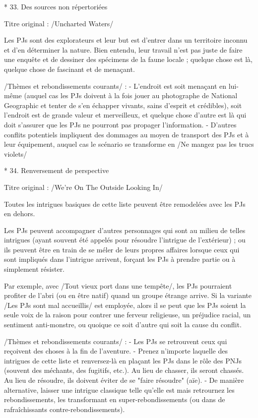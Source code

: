 \begin{enumerate}
* 33. Des sources non répertoriées

Titre original : /Uncharted Waters/

Les PJs sont des explorateurs et leur but est d'entrer dans un territoire inconnu et d'en déterminer la nature. Bien entendu, leur travail n'est pas juste de faire une enquête et de dessiner des spécimens de la faune locale ; quelque chose est là, quelque chose de fascinant et de menaçant.

/Thèmes et rebondissements courants/ :
- L'endroit est soit menaçant en lui-même (auquel cas les PJs doivent à la fois jouer au photographe de National Geographic et tenter de s'en échapper vivants, sains d'esprit et crédibles), soit l'endroit est de grande valeur et merveilleux, et quelque chose d'autre est là qui doit s'assurer que les PJs ne pourront pas propager l'information.
- D'autres conflits potentiels impliquent des dommages au moyen de transport des PJs et à leur équipement, auquel cas le scénario se transforme en /Ne mangez pas les trucs violets/

* 34. Renversement de perspective

Titre original : /We're On The Outside Looking In/

Toutes les intrigues basiques de cette liste peuvent être remodelées avec les PJs en dehors.

Les PJs peuvent accompagner d'autres personnages qui sont au milieu de telles intrigues (ayant souvent été appelés pour résoudre l'intrigue de l'extérieur) ; ou ils peuvent être en train de se méler de leurs propres affaires lorsque ceux qui sont impliqués dans l'intrigue arrivent, forçant les PJs à prendre partie ou à simplement résister.

Par exemple, avec /Tout vieux port dans une tempête/, les PJs pourraient profiter de l'abri (ou en être natif) quand un groupe étrange arrive. Si la variante /Les PJs sont mal accueillis/ est employée, alors il se peut que les PJs soient la seule voix de la raison pour contrer une ferveur religieuse, un préjudice racial, un sentiment anti-monstre, ou quoique ce soit d'autre qui soit la cause du conflit.

/Thèmes et rebondissements courants/ :
- Les PJs se retrouvent ceux qui reçoivent des choses à la fin de l'aventure.
- Prenez n'importe laquelle des intrigues de cette liste et renversez-là en plaçant les PJs dans le rôle des PNJs (souvent des méchants, des fugitifs, etc.). Au lieu de chasser, ils seront chassés. Au lieu de résoudre, ils doivent éviter de se "faire résoudre" (aïe).
- De manière alternative, laisser une intrigue classique telle qu'elle est mais retrournez les rebondissements, les transformant en super-rebondissements (ou dans de rafraîchissants contre-rebondissements).


\end{enumerate}
